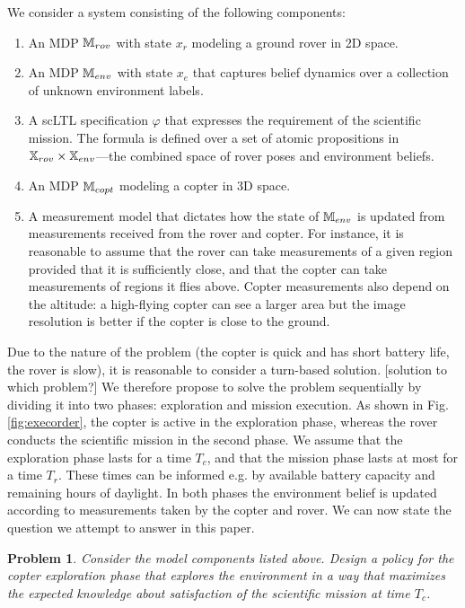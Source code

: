 \documentclass[draft,conference]{IEEEtran}
\newtheorem{problem}{Problem}
\newcommand{\sofie}[1]{{\color{orange}#1}}
\begin{document}
We consider a system consisting of the following components:
\begin{enumerate}
	\item An MDP $\mathbb{M}_{rov}$ with state $x_r$ modeling a ground rover in 2D space.
	\item An MDP $\mathbb{M}_{env}$ with state $x_e$ that captures belief dynamics over a collection of unknown environment labels.
	\item A scLTL specification $\varphi$ that expresses the requirement of the scientific mission. The formula is defined over a set of atomic propositions in $\mathbb{X}_{rov} \times \mathbb{X}_{env}$---the combined space of rover poses and environment beliefs. 
	\item An MDP $\mathbb{M}_{copt}$ modeling a copter in 3D space.
	\item A measurement model that dictates how the state of $\mathbb{M}_{env}$ is updated from measurements received from the rover and copter. For instance, it is reasonable to assume that the rover can take measurements of a given region provided that it is sufficiently close, and that the copter can take measurements of regions it flies above. Copter measurements also depend on the altitude: a high-flying copter can see a larger area but the image resolution is better if the copter is close to the ground.    
\end{enumerate}

Due to the nature of the problem (the copter is quick and has short battery life, the rover is slow), it is reasonable to consider a turn-based solution.
\sofie{[solution to which problem?]}
 We therefore propose to solve the problem sequentially by dividing it into two phases: exploration and mission execution. As shown in Fig. \ref{fig:execorder}, the copter is active in the exploration phase, whereas the rover conducts the scientific mission in the second phase. We assume that the exploration phase lasts for a time $T_c$, and that the mission phase lasts at most for a time $T_r$. These times can be informed e.g. by available battery capacity and remaining hours of daylight. In both phases the environment belief is updated according to measurements taken by the copter and rover. We can now state the question we attempt to answer in this paper.
\begin{problem}
\label{prob:main}
  Consider the model components listed above. Design a policy for the copter exploration phase that explores the environment in a way that maximizes the expected knowledge about satisfaction of the scientific mission at time $T_c$.
\end{problem}
\end{document}

